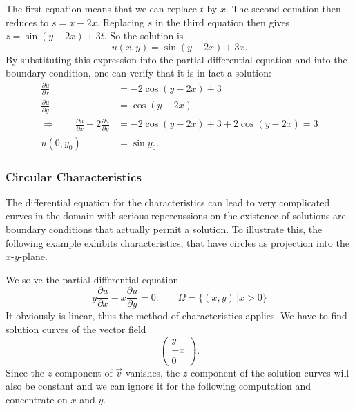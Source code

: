 The first equation means that we can replace $t$ by $x$.
The second equation then reduces to $s=x-2x$.
Replacing $s$ in the third equation then gives $z=\sin(y-2x)+3t$.
So the solution is
\[
u(x,y)=\sin(y-2x)+3x.
\]
By substituting this expression into the partial differential equation
and into the boundary condition, one can verify that it is in fact a 
solution:
\begin{align*}
\frac{\partial u}{\partial x}
&=-2\cos(y-2x)+3
\\
\frac{\partial u}{\partial y}
&=\cos (y-2x)
\\
\Rightarrow\qquad
\frac{\partial u}{\partial x}
+2
\frac{\partial u}{\partial y}
&=
-2\cos(y-2x)+3
+2\cos(y-2x)=3
\\
u(0,y_0)&=\sin y_0.
\end{align*}

\subsubsection{Circular Characteristics}
The differential equation for the characteristics can lead to very 
complicated curves in the domain with serious repercussions on the
existence of solutions are boundary conditions that actually permit
a solution.
To illustrate this, the following example exhibits characteristics, that
have circles as projection into the $x$-$y$-plane.

We solve the partial differential equation
\[
y\frac{\partial u}{\partial x}-x\frac{\partial u}{\partial y}=0.
\qquad\Omega=\{(x,y)\,|x>0\}
\]
It obviously is linear, thus the method of characteristics applies.
We have to find solution curves of the vector field
\[
\begin{pmatrix}
y\\-x\\0
\end{pmatrix}.
\]
Since the $z$-component of $\vec{v}$ vanishes, the $z$-component of the
solution curves will also be constant and we can ignore it for the
following computation and concentrate on $x$ and $y$.


